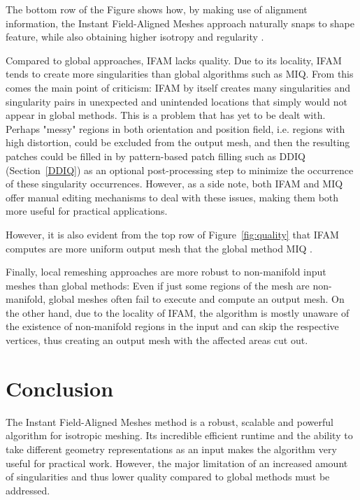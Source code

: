 \documentclass{ACGSeminar}
\begin{document}
The bottom row of the Figure shows how, by making use of alignment information, the Instant Field-Aligned Meshes approach naturally snaps to shape feature, while also obtaining higher isotropy and regularity \cite{jakob2015instant}.

Compared to global approaches, IFAM lacks quality. Due to its locality, IFAM tends to create more singularities than global algorithms such as MIQ. From this comes the main point of criticism: IFAM by itself creates many singularities and singularity pairs in unexpected and unintended locations that simply would not appear in global methods. This is a problem that has yet to be dealt with. Perhaps "messy" regions in both orientation and position field, i.e. regions with high distortion, could be excluded from the output mesh, and then the resulting patches could be filled in by pattern-based patch filling such as DDIQ (Section~\ref{DDIQ}) as an optional post-processing step to minimize the occurrence of these singularity occurrences. However, as a side note, both IFAM and MIQ offer manual editing mechanisms to deal with these issues, making them both more useful for practical applications.

However, it is also evident from the top row of Figure~\ref{fig:quality} that IFAM computes are more uniform output mesh that the global method MIQ \cite{jakob2015instant}.\bigskip

Finally, local remeshing approaches are more robust to non-manifold input meshes than global methods: Even if just some regions of the mesh are non-manifold, global meshes often fail to execute and compute an output mesh. On the other hand, due to the locality of IFAM, the algorithm is mostly unaware of the existence of non-manifold regions in the input and can skip the respective vertices, thus creating an output mesh with the affected areas cut out.

\section{Conclusion}
The Instant Field-Aligned Meshes method is a robust, scalable and powerful algorithm for isotropic meshing. Its incredible efficient runtime and the ability to take different geometry representations as an input makes the algorithm very useful for practical work. However, the major limitation of an increased amount of singularities and thus lower quality compared to global methods must be addressed.\bigskip
\end{document}
